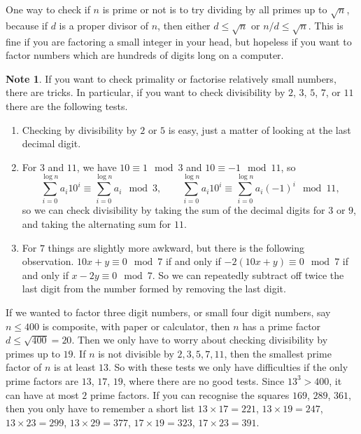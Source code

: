\documentclass{article}
\newcommand{\rb}[1]{\left( #1 \right)}
\theoremstyle{definition}\newtheorem{definition}{Definition}
\theoremstyle{definition}\newtheorem{remark}[definition]{Remark}
\theoremstyle{definition}\newtheorem*{example}{Example}
\theoremstyle{definition}\newtheorem*{note}{Note}
\begin{document}
One way to check if $ n $ is prime or not is to try dividing by all primes up to $ \sqrt{n} $, because if $ d $ is a proper divisor of $ n $, then either $ d \le \sqrt{n} $ or $ n / d \le \sqrt{n} $. This is fine if you are factoring a small integer in your head, but hopeless if you want to factor numbers which are hundreds of digits long on a computer.

\begin{note}
If you want to check primality or factorise relatively small numbers, there are tricks. In particular, if you want to check divisibility by $ 2 $, $ 3 $, $ 5 $, $ 7 $, or $ 11 $ there are the following tests.
\begin{enumerate}
\item Checking by divisibility by $ 2 $ or $ 5 $ is easy, just a matter of looking at the last decimal digit.
\item For $ 3 $ and $ 11 $, we have $ 10 \equiv 1 \mod 3 $ and $ 10 \equiv -1 \mod 11 $, so
$$ \sum_{i = 0}^{\log n} a_i10^i \equiv \sum_{i = 0}^{\log n} a_i \mod 3, \qquad \sum_{i = 0}^{\log n} a_i10^i \equiv \sum_{i = 0}^{\log n} a_i\rb{-1}^i \mod 11, $$
so we can check divisibility by taking the sum of the decimal digits for $ 3 $ or $ 9 $, and taking the alternating sum for $ 11 $.
\item For $ 7 $ things are slightly more awkward, but there is the following observation. $ 10x + y \equiv 0 \mod 7 $ if and only if $ -2\rb{10x + y} \equiv 0 \mod 7 $ if and only if $ x - 2y \equiv 0 \mod 7 $. So we can repeatedly subtract off twice the last digit from the number formed by removing the last digit.
\end{enumerate}
\end{note}

If we wanted to factor three digit numbers, or small four digit numbers, say $ n \le 400 $ is composite, with paper or calculator, then $ n $ has a prime factor $ d \le \sqrt{400} = 20 $. Then we only have to worry about checking divisibility by primes up to $ 19 $. If $ n $ is not divisible by $ 2, 3, 5, 7, 11 $, then the smallest prime factor of $ n $ is at least $ 13 $. So with these tests we only have difficulties if the only prime factors are $ 13 $, $ 17 $, $ 19 $, where there are no good tests. Since $ 13^3 > 400 $, it can have at most $ 2 $ prime factors. If you can recognise the squares $ 169 $, $ 289 $, $ 361 $, then you only have to remember a short list $ 13 \times 17 = 221 $, $ 13 \times 19 = 247 $, $ 13 \times 23 = 299 $, $ 13 \times 29 = 377 $, $ 17 \times 19 = 323 $, $ 17 \times 23 = 391 $.
\end{document}
